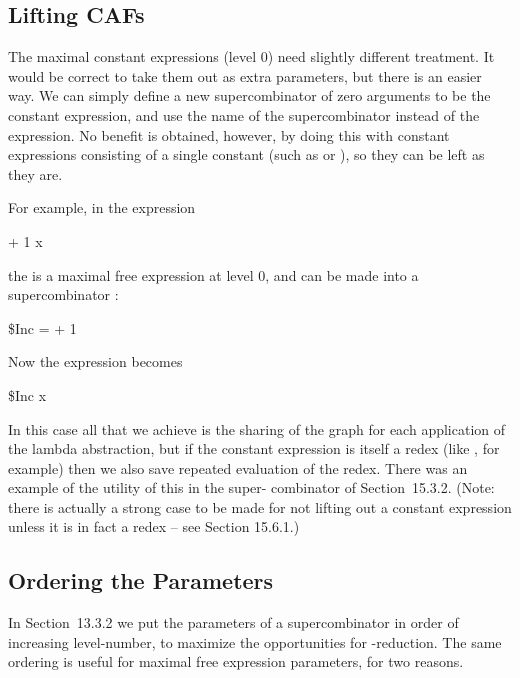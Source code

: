 \subsection{Lifting CAFs}

The maximal constant expressions (level 0) need slightly different treatment.
It would be correct to take them out as extra parameters, but there is an easier
way. We can simply define a new supercombinator of zero arguments to be
the constant expression, and use the name of the supercombinator instead of
the expression. No benefit is obtained, however, by doing this with constant
expressions consisting of a single constant (such as  or ), so they can be left
as they are.

For example, in the expression

\begin{mlcoded}
+ 1 x
\end{mlcoded}

\noindent
the  is a maximal free expression at level 0, and can be made into a
supercombinator :

\begin{mlcoded}
\$Inc = + 1
\end{mlcoded}

\noindent
Now the expression becomes

\begin{mlcoded}
\$Inc x
\end{mlcoded}

\noindent
In this case all that we achieve is the sharing of the  graph for each
application of the lambda abstraction, but if the constant expression is itself a
redex (like , for example) then we also save repeated evaluation of the
redex. There was an example of the utility of this in the  super-
combinator of Section~15.3.2. (Note: there is actually a strong case to be made
for not lifting out a constant expression unless it is in fact a redex -- see Section
15.6.1.)

\subsection{Ordering the Parameters}

In Section~13.3.2 we put the parameters of a supercombinator in order of
increasing level-number, to maximize the opportunities for \ml{\te}-reduction. The
same ordering is useful for maximal free expression parameters, for two
reasons.

